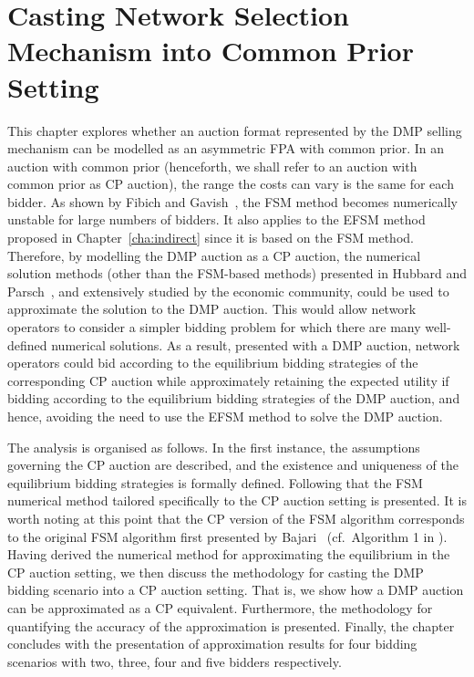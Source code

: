 \chapter{Casting Network Selection Mechanism into Common Prior Setting}
\label{cha:approximation}

\minitoc
\vspace{10mm}

This chapter explores whether an auction format represented by the DMP selling mechanism can be modelled as an asymmetric FPA with common prior. In an auction with common prior (henceforth, we shall refer to an auction with common prior as CP auction), the range the costs can vary is the same for each bidder. As shown by Fibich and Gavish~\cite{FibichGavish2011}, the FSM method becomes numerically unstable for large numbers of bidders. It also applies to the EFSM method proposed in Chapter~\ref{cha:indirect} since it is based on the FSM method. Therefore, by modelling the DMP auction as a CP auction, the numerical solution methods (other than the FSM-based methods) presented in Hubbard and Parsch~\cite{HubbardPaarsch2011}, and extensively studied by the economic community, could be used to approximate the solution to the DMP auction. This would allow network operators to consider a simpler bidding problem for which there are many well-defined numerical solutions. As a result, presented with a DMP auction, network operators could bid according to the equilibrium bidding strategies of the corresponding CP auction while approximately retaining the expected utility if bidding according to the equilibrium bidding strategies of the DMP auction, and hence, avoiding the need to use the EFSM method to solve the DMP auction.

The analysis is organised as follows. In the first instance, the assumptions governing the CP auction are described, and the existence and uniqueness of the equilibrium bidding strategies is formally defined. Following that the FSM numerical method tailored specifically to the CP auction setting is presented. It is worth noting at this point that the CP version of the FSM algorithm corresponds to the original FSM algorithm first presented by Bajari~\cite{Bajari2001a} (cf.~Algorithm 1 in \cite{Bajari2001a}). Having derived the numerical method for approximating the equilibrium in the CP auction setting, we then discuss the methodology for casting the DMP bidding scenario into a CP auction setting. That is, we show how a DMP auction can be approximated as a CP equivalent. Furthermore, the methodology for quantifying the accuracy of the approximation is presented. Finally, the chapter concludes with the presentation of approximation results for four bidding scenarios with two, three, four and five bidders respectively.

